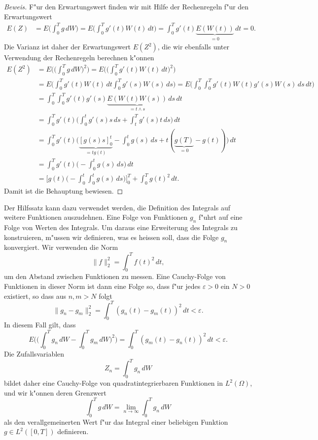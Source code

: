 \begin{proof}[Beweis]
F"ur den Erwartungswert finden wir mit Hilfe der Rechenregeln f"ur den
Erwartungswert
\begin{align*}
E(Z)
&=
E\biggl(\int_0^T g\,dW\biggr)
=
E\biggl(
\int_0^T g'(t) W(t)\,dt
\biggr)
=
\int_0^T g'(t) \underbrace{E(W(t))}_{\textstyle =0}\,dt=0.
\end{align*}
Die Varianz ist daher der Erwartungswert $E(Z^2)$, die wir ebenfalls unter
Verwendung der Rechenregeln berechnen k"onnen
\begin{align*}
E(Z^2)
&=
E\biggl(\biggl(\int_0^T g\,dW\biggr)^2\biggr)
=
E\biggl(
\biggl(
\int_0^T g'(t)W(t)\,dt
\biggr)^2
\biggr)
\\
&=
E\biggl(
\int_0^T g'(t)W(t)\,dt
\int_0^T g'(s)W(s)\,ds
\biggr)
=
E\biggl(
\int_0^T \int_0^T g'(t)W(t) g'(s)W(s) \,ds \,dt
\biggr)
\\
&=
\int_0^T\int_0^Tg'(t)g'(s) \underbrace{E(W(t)W(s))}_{\textstyle =t\wedge s}\,ds\,dt
\\
&=
\int_0^Tg'(t) \biggl(\int_0^t g'(s) s\,ds + \int_t^T g'(s)t\,ds\biggr)
\,dt
\\
&=
\int_0^T g'(t)\biggl(
\underbrace{[g(s)s]_0^t}_{\textstyle =tg(t)}-\int_0^t g(s)\,ds+t(\underbrace{g(T)}_{\textstyle =0}-g(t))
\biggr)\,dt
\\
&=
\int_0^T g'(t)\biggl(-\int_0^t g(s)\,ds\biggr)\,dt
\\
&=
\biggl[
g(t)\biggl(-\int_0^t\int_0^tg(s)\,ds\biggr)
\biggr]_0^T
+
\int_0^Tg(t)^2\,dt.
\end{align*}
Damit ist die Behauptung bewiesen.
\end{proof}
Der Hilfssatz kann dazu verwendet werden, die Definition des Integrals auf
weitere Funktionen auszudehnen.
Eine Folge von Funktionen $g_n$ f"uhrt auf eine Folge von Werten des
Integrals. 
Um daraus eine Erweiterung des Integrals zu konstruieren, m"ussen wir 
definieren, was es heissen soll, dass die Folge $g_n$ konvergiert.
Wir verwenden die Norm
\[
\|f\|_2^2=\int_0^T f(t)^2 \,dt,
\]
um den Abstand zwischen Funktionen zu messen.
Eine Cauchy-Folge von Funktionen in dieser Norm ist dann eine Folge so,
dass f"ur jedes $\varepsilon>0$ ein $N>0$ existiert, so dass aus
$n,m>N$ folgt
\[
\|g_n-g_m\|_2^2=\int_0^T (g_n(t)-g_m(t))^2\,dt<\varepsilon.
\]
In diesem Fall gilt, dass
\[
E\biggl(
\biggl(
\int_0^T g_n\,dW
-
\int_0^T g_m\,dW
\biggr)^2
\biggr)
=
\int_0^T(g_m(t)-g_n(t))^2\,dt<\varepsilon.
\]
Die Zufallsvariablen
\[
Z_n = \int_0^T g_n\,dW
\]
bildet daher eine Cauchy-Folge von quadratintegrierbaren Funktionen
in $L^2(\Omega)$, und wir k"onnen deren Grenzwert
\[
\int_0^T g\,dW
=
\lim_{n\to\infty}\int_0^T g_n\,dW
\]
als den verallgemeinerten Wert f"ur das Integral einer beliebigen Funktion
$g\in L^2([0,T])$ definieren.


